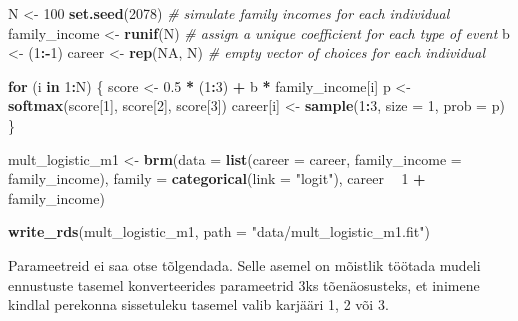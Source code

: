 \documentclass[]{book}
\newenvironment{Shaded}{\begin{snugshade}}{\end{snugshade}}
\newcommand{\CommentTok}[1]{\textcolor[rgb]{0.56,0.35,0.01}{\textit{#1}}}
\newcommand{\ControlFlowTok}[1]{\textcolor[rgb]{0.13,0.29,0.53}{\textbf{#1}}}
\newcommand{\DataTypeTok}[1]{\textcolor[rgb]{0.13,0.29,0.53}{#1}}
\newcommand{\DecValTok}[1]{\textcolor[rgb]{0.00,0.00,0.81}{#1}}
\newcommand{\FloatTok}[1]{\textcolor[rgb]{0.00,0.00,0.81}{#1}}
\newcommand{\KeywordTok}[1]{\textcolor[rgb]{0.13,0.29,0.53}{\textbf{#1}}}
\newcommand{\NormalTok}[1]{#1}
\newcommand{\OperatorTok}[1]{\textcolor[rgb]{0.81,0.36,0.00}{\textbf{#1}}}
\newcommand{\OtherTok}[1]{\textcolor[rgb]{0.56,0.35,0.01}{#1}}
\newcommand{\StringTok}[1]{\textcolor[rgb]{0.31,0.60,0.02}{#1}}
\begin{document}
\begin{Shaded}
\begin{Highlighting}[]
\NormalTok{N <-}\StringTok{ }\DecValTok{100}
\KeywordTok{set.seed}\NormalTok{(}\DecValTok{2078}\NormalTok{)}
\CommentTok{# simulate family incomes for each individual}
\NormalTok{family_income <-}\StringTok{ }\KeywordTok{runif}\NormalTok{(N)}
\CommentTok{# assign a unique coefficient for each type of event}
\NormalTok{b      <-}\StringTok{ }\NormalTok{(}\DecValTok{1}\OperatorTok{:-}\DecValTok{1}\NormalTok{)}
\NormalTok{career <-}\StringTok{ }\KeywordTok{rep}\NormalTok{(}\OtherTok{NA}\NormalTok{, N)  }\CommentTok{# empty vector of choices for each individual}

\ControlFlowTok{for}\NormalTok{ (i }\ControlFlowTok{in} \DecValTok{1}\OperatorTok{:}\NormalTok{N) \{}
\NormalTok{    score     <-}\StringTok{ }\FloatTok{0.5} \OperatorTok{*}\StringTok{ }\NormalTok{(}\DecValTok{1}\OperatorTok{:}\DecValTok{3}\NormalTok{) }\OperatorTok{+}\StringTok{ }\NormalTok{b }\OperatorTok{*}\StringTok{ }\NormalTok{family_income[i]}
\NormalTok{    p         <-}\StringTok{ }\KeywordTok{softmax}\NormalTok{(score[}\DecValTok{1}\NormalTok{], score[}\DecValTok{2}\NormalTok{], score[}\DecValTok{3}\NormalTok{])}
\NormalTok{    career[i] <-}\StringTok{ }\KeywordTok{sample}\NormalTok{(}\DecValTok{1}\OperatorTok{:}\DecValTok{3}\NormalTok{, }\DataTypeTok{size =} \DecValTok{1}\NormalTok{, }\DataTypeTok{prob =}\NormalTok{ p)}
\NormalTok{\}}
\end{Highlighting}
\end{Shaded}

\begin{Shaded}
\begin{Highlighting}[]
\NormalTok{mult_logistic_m1 <-}
\StringTok{  }\KeywordTok{brm}\NormalTok{(}\DataTypeTok{data =} \KeywordTok{list}\NormalTok{(}\DataTypeTok{career =}\NormalTok{ career, }\DataTypeTok{family_income =}\NormalTok{ family_income), }
      \DataTypeTok{family =} \KeywordTok{categorical}\NormalTok{(}\DataTypeTok{link =} \StringTok{"logit"}\NormalTok{),}
\NormalTok{      career }\OperatorTok{~}\StringTok{ }\DecValTok{1} \OperatorTok{+}\StringTok{ }\NormalTok{family_income)}

\KeywordTok{write_rds}\NormalTok{(mult_logistic_m1, }\DataTypeTok{path =} \StringTok{"data/mult_logistic_m1.fit"}\NormalTok{)}
\end{Highlighting}
\end{Shaded}

Parameetreid ei saa otse tõlgendada. Selle asemel on mõistlik töötada mudeli ennustuste tasemel konverteerides parameetrid 3ks tõenäosusteks, et inimene kindlal perekonna sissetuleku tasemel valib karjääri 1, 2 või 3.
\end{document}
